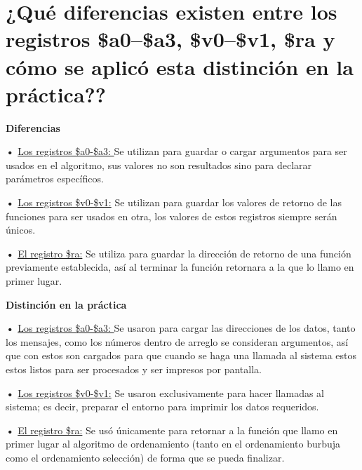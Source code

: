 \documentclass{article}
\begin{document}
\quad
\newpage







\section{¿Qué diferencias existen entre los registros \$a0–\$a3, \$v0–\$v1, \$ra y cómo se aplicó esta distinción en la práctica??}

\quad

\textbf{Diferencias }

\quad

\textbf{•   } \underline{ Los registros \$a0-\$a3: } {Se utilizan para guardar o cargar argumentos para ser usados en el algoritmo, sus valores no son resultados sino para declarar parámetros específicos.}

\quad

\textbf{•   } \underline{ Los registros \$v0-\$v1:} { Se utilizan para guardar los valores de retorno de las funciones para ser usados en otra, los valores de estos registros siempre serán únicos.}

\quad

\textbf{•   } \underline{ El registro \$ra:} { Se utiliza para guardar la dirección de retorno de una función previamente establecida, así al terminar la función retornara a la que lo llamo en primer lugar.}

\quad

\textbf{Distinción en la práctica }

\quad

\textbf{•   } \underline{ Los registros \$a0-\$a3: } { Se usaron para cargar las direcciones de los datos, tanto los mensajes, como los números dentro de arreglo se consideran argumentos, así que con estos son cargados para que cuando se haga una llamada al sistema estos estos listos para ser procesados y ser impresos por pantalla.}

\quad

\textbf{•   } \underline{ Los registros \$v0-\$v1:} { Se usaron exclusivamente para hacer llamadas al sistema; es decir, preparar el entorno para imprimir los datos requeridos.}

\quad

\textbf{•   } \underline{ El registro \$ra:} { Se usó únicamente para retornar a la función que llamo en primer lugar al algoritmo de ordenamiento (tanto en el ordenamiento burbuja como el ordenamiento selección) de forma que se pueda finalizar.}
\end{document}
